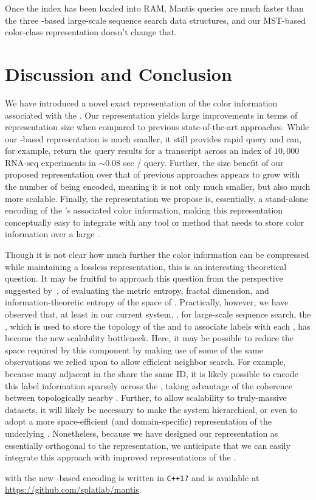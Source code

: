 Once the index has been loaded into RAM, Mantis queries are much faster than the
three \sbt-based large-scale sequence search data structures, and our MST-based
color-class representation doesn't change that.

%
\section{Discussion and Conclusion}
\label{sec:mantis_conclusion}

We have introduced a novel exact representation of the color
information associated with the \cdbg. Our representation yields large
improvements in terms of representation size when compared to previous
state-of-the-art approaches. While our \mst-based representation is
much smaller, it still provides rapid query and can, for example,
return the query results for a transcript across an index of $10,000$
RNA-seq experiments in $\sim{0.08}$ sec / query. Further, the size
benefit of our proposed representation over that of previous approaches
appears to grow with the number of \ccs being encoded, meaning it is
not only much smaller, but also much more scalable. Finally, the
representation we propose is, essentially, a stand-alone encoding of
the \cdbg's associated color information, making this representation
conceptually easy to integrate with any tool or method that needs to
store color information over a large \dbg.

Though it is not clear how much further the color information can be compressed
while maintaining a lossless representation, this is an interesting theoretical
question. It may be fruitful to approach this question from the perspective suggested
by~\citet{yu2015entropy}, of evaluating the metric entropy, fractal
dimension, and information-theoretic entropy of the space of \ccs. Practically, however,
we have observed that, at least in our current system, \mantis, for large-scale
sequence search, the \cqf, which is used to store the topology of the \dbg and
to associate \cc labels with each \kmer, has become the new scalability
bottleneck. Here, it may be possible to reduce the space required by this
component by making use of some of the same observations we relied upon to allow
efficient \cc neighbor search. For example, because many adjacent \kmers in the
\dbg share the same \cc ID, it is likely possible to encode this label
information sparsely across the \dbg, taking advantage of the coherence between
topologically nearby \kmers. Further, to allow scalability to truly-massive
datasets, it will likely be necessary to make the system hierarchical, or even
to adopt a more space-efficient (and domain-specific) representation of the
underlying \dbg. Nonetheless, because we have designed our \cc representation as
essentially orthogonal to the \dbg representation, we anticipate that we can
easily integrate this approach with improved representations of the \dbg.

\mantis with the new \mst-based \cc encoding is written in
\texttt{C++17} and is available at
\url{https://github.com/splatlab/mantis}.
